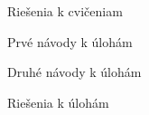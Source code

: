 \sec Riešenia k cvičeniam

\DisplayExerciseSolutions

\sec Prvé návody k úlohám

\DisplayFirstHints

\sec Druhé návody k úlohám

\DisplaySecondHints

\sec Riešenia k úlohám

\DisplayProblemSolutions

\bye
